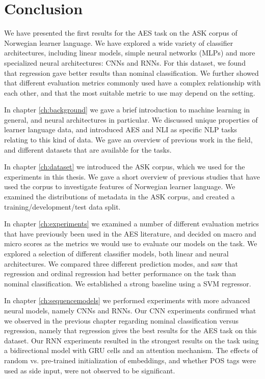\chapter{Conclusion} \label{ch:conclusion}

We have presented the first results for the \ac{AES} task on the ASK corpus
of Norwegian learner language. We have explored a wide variety of classifier
architectures, including linear models, simple neural networks (\acp{MLP})
and more specialized neural architectures: \acp{CNN} and \acp{RNN}. For this
dataset, we found that regression gave better results than nominal
classification. We further showed that different evaluation metrics commonly
used have a complex relationship with each other, and that the most suitable
metric to use may depend on the setting.

In chapter \ref{ch:background} we gave a brief introduction to machine
learning in general, and neural architectures in particular. We discussed
unique properties of learner language data, and introduced \ac{AES} and
\ac{NLI} as specific \ac{NLP} tasks relating to this kind of data. We gave an
overview of previous work in the field, and different datasets that are
available for the tasks.

In chapter \ref{ch:dataset} we introduced the ASK corpus, which we used for
the experiments in this thesis. We gave a short overview of previous studies
that have used the corpus to investigate features of Norwegian learner
language. We examined the distributions of metadata in the ASK corpus, and
created a training/development/test data split. 

In chapter \ref{ch:experiments} we examined a number of different evaluation
metrics that have previously been used in the \ac{AES} literature, and
decided on macro and micro \FI scores as the metrics we would use to evaluate
our models on the task. We explored a selection of different classifier
models, both linear and neural architectures. We compared three different
prediction modes, and saw that regression and ordinal regression had better
performance on the task than nominal classification. We established a strong
baseline using a \ac{SVM} regressor.

In chapter \ref{ch:sequencemodels} we performed experiments with more
advanced neural models, namely \acp{CNN} and \acp{RNN}. Our CNN experiments
confirmed what we observed in the previous chapter regarding nominal
classification versus regression, namely that regression gives the best
results for the \ac{AES} task on this dataset. Our \ac{RNN} experiments
resulted in the strongest results on the task using a bidirectional model
with GRU cells and an attention mechanism. The effects of random vs.
pre-trained initialization of embeddings, and whether \ac{POS} tags were used
as side input, were not observed to be significant.

